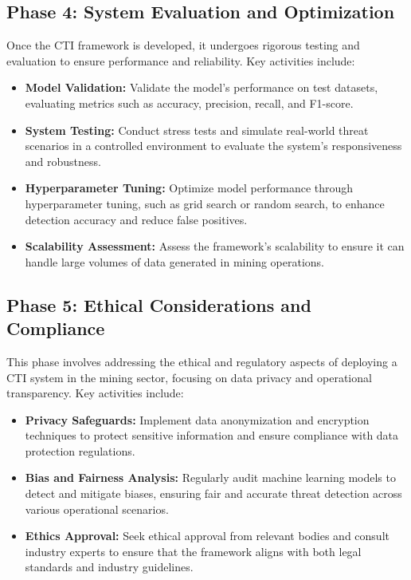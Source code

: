 \documentclass[a4paper,twoside,12pt]{report}
\begin{document}
\subsection{Phase 4: System Evaluation and Optimization}  
Once the CTI framework is developed, it undergoes rigorous testing and evaluation to ensure performance and reliability. Key activities include:
\begin{itemize}
    \item \textbf{Model Validation:} Validate the model’s performance on test datasets, evaluating metrics such as accuracy, precision, recall, and F1-score.
    \item \textbf{System Testing:} Conduct stress tests and simulate real-world threat scenarios in a controlled environment to evaluate the system’s responsiveness and robustness.
    \item \textbf{Hyperparameter Tuning:} Optimize model performance through hyperparameter tuning, such as grid search or random search, to enhance detection accuracy and reduce false positives.
    \item \textbf{Scalability Assessment:} Assess the framework’s scalability to ensure it can handle large volumes of data generated in mining operations.
\end{itemize}

\subsection{Phase 5: Ethical Considerations and Compliance}  
This phase involves addressing the ethical and regulatory aspects of deploying a CTI system in the mining sector, focusing on data privacy and operational transparency. Key activities include:
\begin{itemize}
    \item \textbf{Privacy Safeguards:} Implement data anonymization and encryption techniques to protect sensitive information and ensure compliance with data protection regulations.
    \item \textbf{Bias and Fairness Analysis:} Regularly audit machine learning models to detect and mitigate biases, ensuring fair and accurate threat detection across various operational scenarios.
    \item \textbf{Ethics Approval:} Seek ethical approval from relevant bodies and consult industry experts to ensure that the framework aligns with both legal standards and industry guidelines.
\end{itemize}
\end{document}
